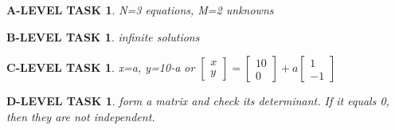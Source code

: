 \documentclass{book}
\numberwithin{equation}{section}
\newtheorem{alevel}{A-LEVEL TASK}
\newtheorem{blevel}{B-LEVEL TASK}
\newtheorem{clevel}{C-LEVEL TASK}
\newtheorem{dlevel}{D-LEVEL TASK}
\theoremstyle{definition}
\begin{document}
\begin{alevel}N=3 equations, M=2 unknowns\end{alevel}
\begin{blevel}infinite solutions\end{blevel}
\begin{clevel}x=a, y=10-a or 
$\left[ \begin{matrix}x\\y \end{matrix}\right]=
\left[ \begin{matrix}10\\0 \end{matrix}\right]+
a\left[ \begin{matrix}1\\-1 \end{matrix}\right]$
\end{clevel}

\begin{dlevel}form a matrix and check its determinant. If it equals 0, then they are not independent.\end{dlevel}
\end{document}
